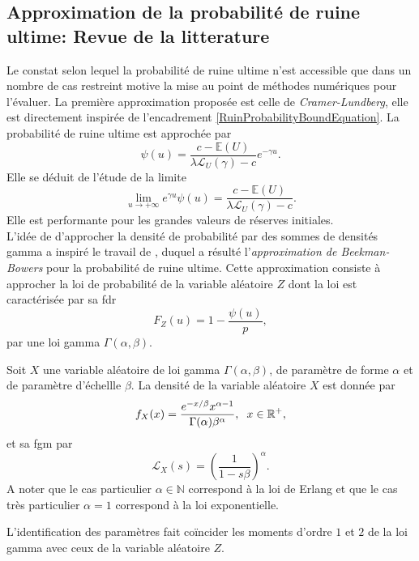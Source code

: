 \subsection{Approximation de la probabilité de ruine ultime: Revue de la litterature}
Le constat selon lequel la probabilité de ruine ultime n'est accessible que dans un nombre de cas restreint motive la mise au point de méthodes numériques pour l'évaluer. La première approximation proposée est celle de \textit{Cramer-Lundberg}, elle est directement inspirée de l\rq{}encadrement \eqref{RuinProbabilityBoundEquation}. La probabilité de ruine ultime est approchée par
\begin{equation}\label{CramerLundbergApproximation}
\psi(u)=\frac{c-\mathbb{E}(U)}{\lambda\mathcal{L}_{U}(\gamma)-c}e^{-\gamma u}.
\end{equation}
Elle se déduit de l'étude de la limite
\begin{equation}
\underset{u\rightarrow+\infty}{\lim} e^{\gamma u}\psi(u)=\frac{c-\mathbb{E}(U)}{\lambda\mathcal{L}_{U}(\gamma)-c}.
\end{equation}
Elle est performante pour les grandes valeurs de réserves initiales.\\

L'idée de \citet{Bo66} d'approcher la densité de probabilité par des sommes de densités gamma a inspiré le travail de \citet{Be69}, duquel a résulté l'\textit{approximation de Beekman-Bowers} pour la probabilité de ruine ultime. Cette approximation consiste à approcher la loi de probabilité de la variable aléatoire $Z$ dont la loi est caractérisée par sa \gls{fdr}
\begin{equation*}
F_{Z}(u)=1-\frac{\psi(u)}{p},
\end{equation*}
par une loi gamma $\Gamma(\alpha,\beta)$. 
\begin{Def}\label{DefinitionGamma}
Soit $X$ une variable aléatoire de loi gamma $\Gamma(\alpha,\beta)$, de paramètre de forme $\alpha$ et de paramètre d'échellle $\beta$. La densité de la variable aléatoire $X$ est donnée par 
\begin{equation}\label{GammaDensity}
f_{X}(x)=\frac{e^{-x/\beta}x^{\alpha-1}}{\Gamma(\alpha)\beta^{\alpha}},\hspace{0.2cm}x\in\mathbb{R}^{+},
\end{equation}
et sa \gls{fgm} par
\begin{equation}\label{fgmGamma}
\mathcal{L}_{X}(s)=\left(\frac{1}{1-s\beta}\right)^{\alpha}.
\end{equation}
A noter que le cas particulier $\alpha\in\mathbb{N}$ correspond à la loi de Erlang et que le cas très particulier $\alpha=1$ correspond à la loi exponentielle.
\end{Def}
L'identification des paramètres fait coïncider les moments d'ordre $1$ et $2$ de la loi gamma avec ceux de la variable aléatoire $Z$.\\

